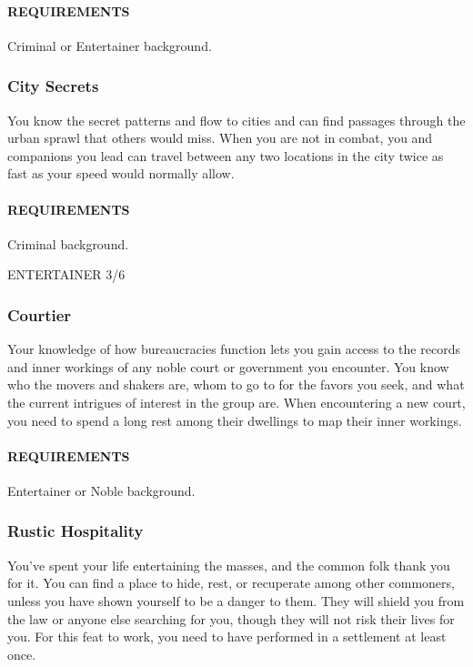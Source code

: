     \paragraph{REQUIREMENTS} Criminal or Entertainer background.

    \subsubsection{City Secrets} \label{feat::citysecrets}
    You know the secret patterns and flow to cities and can find passages through the urban sprawl that others would miss.
    When you are not in combat, you and companions you lead can travel between any two locations in the city twice as fast as your speed would normally allow.
    \paragraph{REQUIREMENTS} Criminal background.

ENTERTAINER 3/6
    \subsubsection{Courtier} \label{feat::courtier}
    Your knowledge of how bureaucracies function lets you gain access to the records and inner workings of any noble court or government you encounter.
    You know who the movers and shakers are, whom to go to for the favors you seek, and what the current intrigues of interest in the group are.
    When encountering a new court, you need to spend a long rest among their dwellings to map their inner workings.
    \paragraph{REQUIREMENTS} Entertainer or Noble background.

    \subsubsection{Rustic Hospitality} \label{feat::rustichospitality}
    You've spent your life entertaining the masses, and the common folk thank you for it.
    You can find a place to hide, rest, or recuperate among other commoners, unless you have shown yourself to be a danger to them.
    They will shield you from the law or anyone else searching for you, though they will not risk their lives for you.
    For this feat to work, you need to have performed in a settlement at least once.

